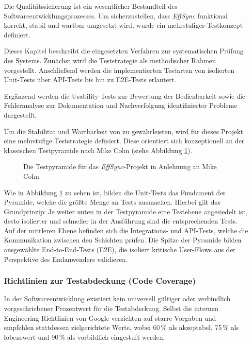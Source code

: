 \label{ch:testing_quality}
Die Qualitätssicherung ist ein wesentlicher Bestandteil des Softwareentwicklungsprozesses. Um sicherzustellen, dass \textit{EffSync} funktional korrekt, stabil und wartbar umgesetzt wird, wurde ein mehrstufiges Testkonzept definiert.

Dieses Kapitel beschreibt die eingesetzten Verfahren zur systematischen Prüfung des Systems. Zunächst wird die Teststrategie als methodischer Rahmen vorgestellt. Anschließend werden die implementierten Testarten von isolierten Unit-Tests über API-Tests bis hin zu E2E-Tests erläutert.

Ergänzend werden die Usability-Tests zur Bewertung der Bedienbarkeit sowie die Fehleranalyse zur Dokumentation und Nachverfolgung identifizierter Probleme dargestellt.

\label{sec:test_strategie}

Um die Stabilität und Wartbarkeit von  zu gewährleisten, wird für dieses Projekt eine mehrstufige Teststrategie definiert. Diese orientiert sich konzeptionell an der klassischen Testpyramide nach Mike Cohn \cite{cohn2009succeeding} (siehe Abbildung \ref{fig:testpyramide}). 

\begin{figure}[H]
    \centering
     
    \caption{Die Testpyramide für das \textit{EffSync}-Projekt in Anlehnung an Mike Cohn}
    \label{fig:testpyramide}
\end{figure}

Wie in Abbildung \ref{fig:testpyramide} zu sehen ist, bilden die Unit-Tests das Fundament der Pyramide, welche die größte Menge an Tests ausmachen. Hierbei gilt das Grundprinzip: Je weiter unten in der Testpyramide eine Testebene angesiedelt ist, desto isolierter und schneller in der Ausführung sind die entsprechenden Tests. Auf der mittleren Ebene befinden sich die Integrations- und API-Tests, welche die Kommunikation zwischen den Schichten prüfen. Die Spitze der Pyramide bilden ausgewählte End-to-End-Tests (E2E), die isoliert kritische User-Flows aus der Perspektive des Endanwenders validieren.

\subsubsection{Richtlinien zur Testabdeckung (Code Coverage)}
In der Softwareentwicklung existiert kein universell gültiger oder verbindlich vorgeschriebener Prozentwert für die Testabdeckung. Selbst die internen Engineering-Richtlinien von Google \cite{google2020coverage} verzichten auf starre Vorgaben und empfehlen stattdessen zielgerichtete Werte, wobei 60\,\% als akzeptabel, 75\,\% als lobenswert und 90\,\% als vorbildlich eingestuft werden. 


